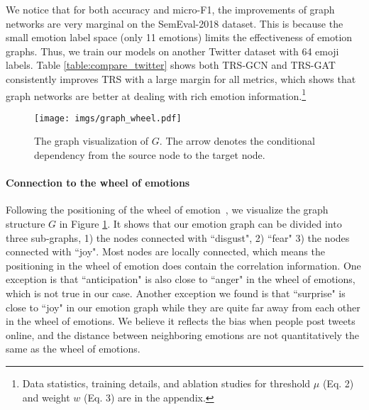 \documentclass[11pt,a4paper]{article}
\begin{document}
We notice that for both accuracy and micro-F1, the improvements of graph networks are very marginal on the SemEval-2018 dataset. This is because the small emotion label space (only 11 emotions) limits the effectiveness of emotion graphs.
Thus, we train our models on another Twitter dataset with 64 emoji labels. Table \ref{table:compare_twitter} shows both TRS-GCN and TRS-GAT consistently improves TRS with a large margin for all metrics, which shows that graph networks are better at dealing with rich emotion information.\footnote{Data statistics, training details, and ablation studies for threshold $\mu$ (Eq. 2) and weight $w$ (Eq. 3) are in the appendix.}




\begin{table}[t]
\centering
{}
\caption{ Comparison of F1 scores between BERT-GAT, BERT-GCN and BERT for ``surprise" and ``trust".}
\label{table:compare_semeval_bert}
\end{table}








\begin{figure}[!ht]
    \centering
    \texttt{[image: imgs/graph\_wheel.pdf]}
    \caption{The graph visualization of $G$. The arrow denotes the conditional dependency from the source node to the target node.}
    \label{fig:graph-wheel}
\end{figure}

\paragraph{Connection to the wheel of emotions}
Following the positioning of the wheel of emotion~\cite{plutchik1984emotions}, we visualize the graph structure $G$ in Figure \ref{fig:graph-wheel}. It shows that our emotion graph can be divided into three sub-graphs, 1) the nodes connected with ``disgust", 2) ``fear" 3) the nodes connected with ``joy". Most nodes are locally connected, which means the positioning in the wheel of emotion does contain the correlation information. One exception is that ``anticipation" is also close to ``anger" in the wheel of emotions, which is not true in our case. Another exception we found is that ``surprise" is close to ``joy" in our emotion graph while they are quite far away from each other in the wheel of emotions. We believe it reflects the bias when people post tweets online, and the distance between neighboring emotions are not quantitatively the same as the wheel of emotions. 
\end{document}
